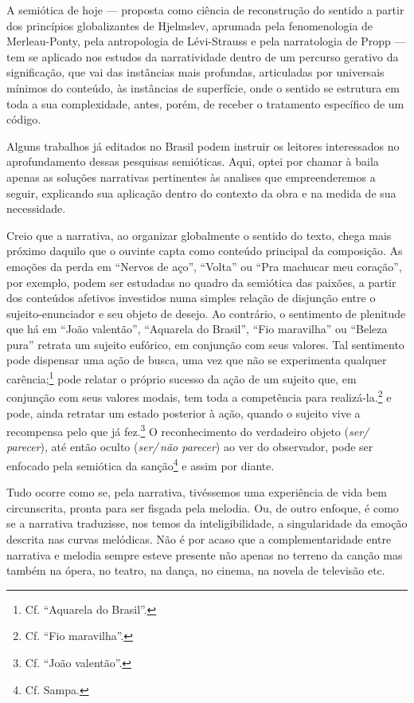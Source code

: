 A semiótica de hoje ---
proposta como ciência de reconstrução do sentido a partir dos princípios
globalizantes de Hjelmslev, aprumada pela fenomenologia de
Merleau-Ponty, pela antropologia de Lévi-Strauss e pela narratologia de
Propp --- tem se aplicado nos estudos da narratividade dentro de um
percurso gerativo da significação, que vai das instâncias mais profundas, articuladas por universais mínimos do conteúdo, às instâncias de
superfície, onde o sentido se estrutura em toda a sua complexidade,
antes, porém, de receber o tratamento específico de um código.

Alguns trabalhos já editados no Brasil podem instruir os leitores
interessados no aprofundamento dessas pesquisas semióticas. Aqui,
optei por chamar à baila apenas as soluções narrativas pertinentes às
analises que empreenderemos a seguir, explicando sua aplicação dentro do
contexto da obra e na medida de sua necessidade.

Creio que a narrativa, ao organizar globalmente o sentido do texto,
chega mais próximo daquilo que o ouvinte capta como conteúdo principal
da composição. As emoções da perda em ``Nervos de aço'', ``Volta'' ou ``Pra
machucar meu coração'', por exemplo, podem ser estudadas no quadro da
semiótica das paixões, a partir dos conteúdos afetivos investidos numa
simples relação de disjunção entre o sujeito-enunciador e seu objeto de
desejo. Ao contrário, o sentimento de plenitude que há em ``João valentão'',
``Aquarela do Brasil'', ``Fio maravilha'' ou ``Beleza pura'' retrata um sujeito
eufórico, em conjunção com seus valores. Tal sentimento pode dispensar
uma ação de busca, uma vez que não se experimenta qualquer carência;\footnote{Cf. ``Aquarela do Brasil''.} pode relatar o próprio sucesso da ação de um
sujeito que, em conjunção com seus valores modais, tem toda a
competência para realizá-la.\footnote{Cf. ``Fio maravilha''.} e pode, ainda retratar
um estado posterior à ação, quando o sujeito vive a recompensa pelo que
já fez.\footnote{Cf. ``João valentão''.} O reconhecimento do verdadeiro objeto
(\textit{ser/\,parecer}), até então oculto (\textit{ser/\,não parecer}) ao ver do observador,
pode ser enfocado pela semiótica da sanção\footnote{Cf. Sampa.} e assim por
diante.

Tudo ocorre como se, pela narrativa, tivéssemos uma experiência de vida
bem circunscrita, pronta para ser fisgada pela melodia. Ou, de outro
enfoque, é como se a narrativa traduzisse, nos temos da
inteligibilidade, a singularidade da emoção descrita nas curvas
melódicas. Não é por acaso que a complementaridade entre narrativa e
melodia sempre esteve presente não apenas no terreno da canção mas
também na ópera, no teatro, na dança, no cinema, na novela de televisão
etc.

